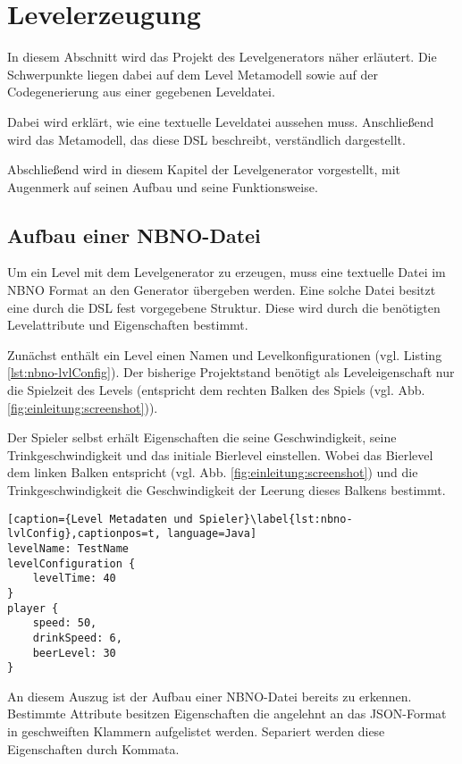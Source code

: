 \section{Levelerzeugung}\label{sec:levelerzeugung}

In diesem Abschnitt wird das Projekt des Levelgenerators näher erläutert. Die Schwerpunkte liegen dabei auf dem Level Metamodell sowie auf der Codegenerierung aus einer gegebenen Leveldatei. 
 
Dabei wird erklärt, wie eine textuelle Leveldatei aussehen muss. Anschließend wird das Metamodell, das diese DSL beschreibt, verständlich dargestellt.

Abschließend wird in diesem Kapitel der Levelgenerator vorgestellt, mit Augenmerk auf seinen Aufbau und seine Funktionsweise.

\subsection{Aufbau einer NBNO-Datei}
Um ein Level mit dem Levelgenerator zu erzeugen, muss eine textuelle Datei im NBNO Format an den Generator übergeben werden. Eine solche Datei besitzt eine durch die DSL fest vorgegebene Struktur. Diese wird durch die benötigten Levelattribute und Eigenschaften bestimmt.

Zunächst enthält ein Level einen Namen und Levelkonfigurationen (vgl. Listing \ref{lst:nbno-lvlConfig}). Der bisherige Projektstand benötigt als Leveleigenschaft nur die Spielzeit des Levels (entspricht dem rechten Balken des Spiels (vgl. Abb. \ref{fig:einleitung:screenshot})).

Der Spieler selbst erhält Eigenschaften die seine Geschwindigkeit, seine Trinkgeschwindigkeit und das initiale Bierlevel einstellen. Wobei das Bierlevel dem linken Balken entspricht (vgl. Abb. \ref{fig:einleitung:screenshot}) und die Trinkgeschwindigkeit die Geschwindigkeit der Leerung dieses Balkens bestimmt.

\begin{lstlisting}[caption={Level Metadaten und Spieler}\label{lst:nbno-lvlConfig},captionpos=t, language=Java]
levelName: TestName
levelConfiguration {
    levelTime: 40
}
player {
    speed: 50,
    drinkSpeed: 6,
    beerLevel: 30
}
\end{lstlisting}

An diesem Auszug ist der Aufbau einer NBNO-Datei bereits zu erkennen.
Bestimmte Attribute besitzen Eigenschaften die angelehnt an das JSON-Format in geschweiften Klammern aufgelistet werden. Separiert werden diese Eigenschaften durch Kommata.

